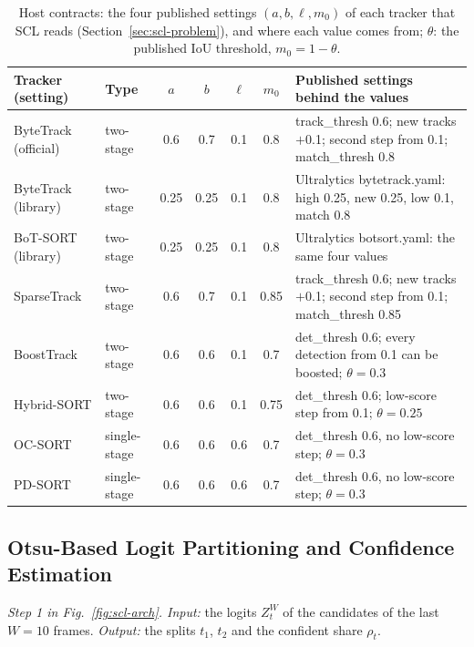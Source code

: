 \begin{table}[tbp]
\centering
\caption{Host contracts: the four published settings $(a,b,\ell,m_0)$ of each tracker that SCL reads (Section~\ref{sec:scl-problem}), and where each value comes from; $\theta$: the published IoU threshold, $m_0=1-\theta$.}
\label{tab:scl-contracts}
\begin{tabular}{>{\raggedright\arraybackslash}p{2.6cm}>{\raggedright\arraybackslash}p{1.6cm}cccc>{\raggedright\arraybackslash}p{5.6cm}}
\toprule
Tracker (setting) & Type & $a$ & $b$ & $\ell$ & $m_0$ & Published settings behind the values\\
\midrule
ByteTrack (official) & two-stage & 0.6 & 0.7 & 0.1 & 0.8 & track\_thresh 0.6; new tracks $+$0.1; second step from 0.1; match\_thresh 0.8\\
ByteTrack (library) & two-stage & 0.25 & 0.25 & 0.1 & 0.8 & Ultralytics bytetrack.yaml: high 0.25, new 0.25, low 0.1, match 0.8\\
BoT-SORT (library) & two-stage & 0.25 & 0.25 & 0.1 & 0.8 & Ultralytics botsort.yaml: the same four values\\
SparseTrack & two-stage & 0.6 & 0.7 & 0.1 & 0.85 & track\_thresh 0.6; new tracks $+$0.1; second step from 0.1; match\_thresh 0.85\\
BoostTrack & two-stage & 0.6 & 0.6 & 0.1 & 0.7 & det\_thresh 0.6; every detection from 0.1 can be boosted; $\theta=0.3$\\
Hybrid-SORT & two-stage & 0.6 & 0.6 & 0.1 & 0.75 & det\_thresh 0.6; low-score step from 0.1; $\theta=0.25$\\
OC-SORT & single-stage & 0.6 & 0.6 & 0.6 & 0.7 & det\_thresh 0.6, no low-score step; $\theta=0.3$\\
PD-SORT & single-stage & 0.6 & 0.6 & 0.6 & 0.7 & det\_thresh 0.6, no low-score step; $\theta=0.3$\\
\bottomrule
\end{tabular}
\end{table}

\subsection{Otsu-Based Logit Partitioning and Confidence Estimation}\label{sec:scl-calib}
\emph{Step 1 in Fig.~\ref{fig:scl-arch}. Input:} the logits $Z_t^W$ of the candidates of the last $W=10$ frames. \emph{Output:} the splits $t_1$, $t_2$ and the confident share $\rho_t$.

